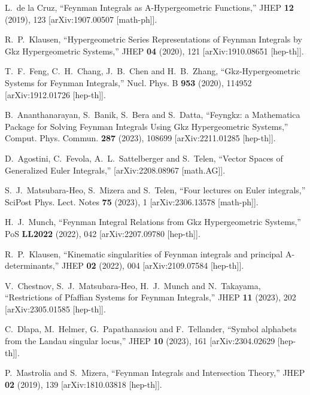 \documentclass[a4paper,12pt]{article}
\numberwithin{equation}{section}
\numberwithin{figure}{section}
\begin{document}
\begin{thebibliography}{99}
L.~de la Cruz,
``Feynman Integrals as A-Hypergeometric Functions,''
JHEP \textbf{12} (2019), 123
[arXiv:1907.00507 [math-ph]].

R.~P.~Klausen,
``Hypergeometric Series Representations of Feynman Integrals by Gkz Hypergeometric Systems,''
JHEP \textbf{04} (2020), 121
[arXiv:1910.08651 [hep-th]].
  
T.~F.~Feng, C.~H.~Chang, J.~B.~Chen and H.~B.~Zhang,
``Gkz-Hypergeometric Systems for Feynman Integrals,''
Nucl. Phys. B \textbf{953} (2020), 114952
[arXiv:1912.01726 [hep-th]].

B.~Ananthanarayan, S.~Banik, S.~Bera and S.~Datta,
``Feyngkz: a Mathematica Package for Solving Feynman Integrals Using Gkz Hypergeometric Systems,''
Comput. Phys. Commun. \textbf{287} (2023), 108699
[arXiv:2211.01285 [hep-th]].

D.~Agostini, C.~Fevola, A.~L.~Sattelberger and S.~Telen,
``Vector Spaces of Generalized Euler Integrals,''
[arXiv:2208.08967 [math.AG]].

S.~J.~Matsubara-Heo, S.~Mizera and S.~Telen,
``Four lectures on Euler integrals,''
SciPost Phys. Lect. Notes \textbf{75} (2023), 1
[arXiv:2306.13578 [math-ph]].

H.~J.~Munch,
``Feynman Integral Relations from Gkz Hypergeometric Systems,''
PoS \textbf{LL2022} (2022), 042
[arXiv:2207.09780 [hep-th]].

R.~P.~Klausen,
``Kinematic singularities of Feynman integrals and principal A-determinants,''
JHEP \textbf{02} (2022), 004
[arXiv:2109.07584 [hep-th]].


V.~Chestnov, S.~J.~Matsubara-Heo, H.~J.~Munch and N.~Takayama,
``Restrictions of Pfaffian Systems for Feynman Integrals,''
JHEP \textbf{11} (2023), 202
[arXiv:2305.01585 [hep-th]].


C.~Dlapa, M.~Helmer, G.~Papathanasiou and F.~Tellander,
``Symbol alphabets from the Landau singular locus,''
JHEP \textbf{10} (2023), 161
[arXiv:2304.02629 [hep-th]].
 

P.~Mastrolia and S.~Mizera,
``Feynman Integrals and Intersection Theory,''
JHEP \textbf{02} (2019), 139
[arXiv:1810.03818 [hep-th]].


\end{thebibliography}
\end{document}
